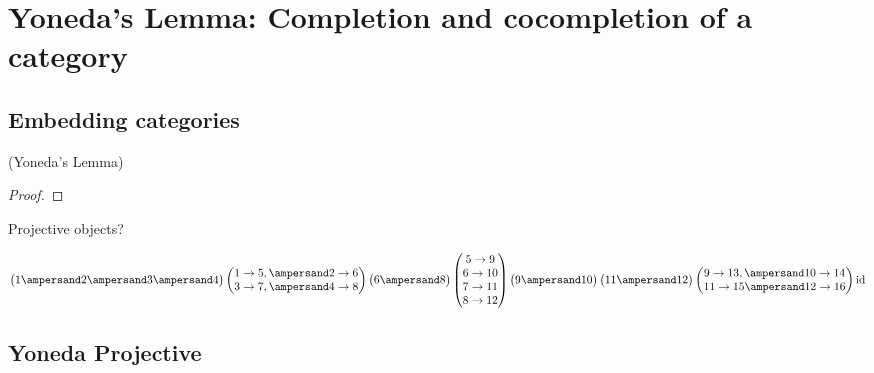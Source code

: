 
\section{Yoneda's Lemma: Completion and cocompletion of a category}

\subsection{Embedding categories}

\begin{lemma}{(Yoneda's Lemma)}

\begin{proof}

\end{proof}
\end{lemma}

Projective objects?

\[
\begin{pmatrix}1 \ampersand 2 \ampersand 3 \ampersand 4\end{pmatrix}
\begin{pmatrix} 1\to5, \ampersand 2\to6 \\ 3\to7, \ampersand 4\to8 \end{pmatrix}
\begin{pmatrix}6 \ampersand 8\end{pmatrix}
\begin{pmatrix}5\to9\\6\to10\\7\to11\\8\to12\end{pmatrix}
\begin{pmatrix}9\ampersand10\end{pmatrix}\begin{pmatrix}11\ampersand12\end{pmatrix}
\begin{pmatrix}9\to13, \ampersand 10\to14\\11\to15 \ampersand 12\to16\end{pmatrix}
\textup{id}
\]

\subsection{Yoneda Projective}

